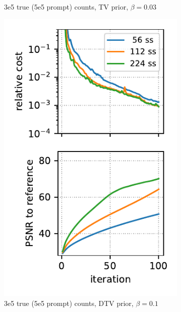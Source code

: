 \begin{figure}
\begin{subfigure}[b]{0.23\textwidth}
    \caption{3e5 true (5e5 prompt) counts, TV prior, $\beta = 0.03$}
  \end{subfigure}
  \hfill
  \begin{subfigure}[b]{0.23\textwidth}
    \centering
    \includegraphics[width=1.0\textwidth]{./figs/brain2d_counts_3.0E+05_seed_1_beta_1.0E-01_prior_DTV_niter_ref_20000_fwhm_4.5_4.5_niter_100_ss.pdf}
    \caption{3e5 true (5e5 prompt) counts, DTV prior, $\beta = 0.1$}
  \end{subfigure}
  \hfill
  \begin{subfigure}[b]{0.23\textwidth}
    \centering

\end{subfigure}
\end{figure}
